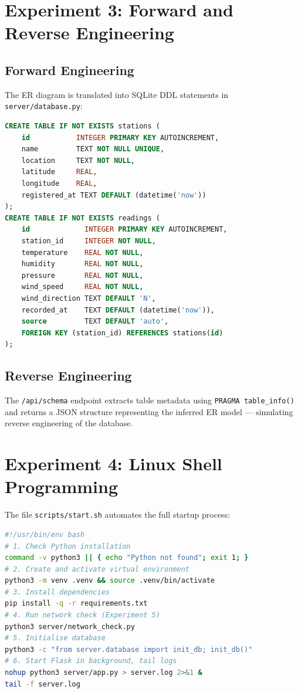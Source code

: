 \documentclass[12pt,a4paper]{article}
\begin{document}
\section{Experiment 3: Forward and Reverse Engineering}

\subsection{Forward Engineering}
The ER diagram is translated into SQLite DDL statements in \texttt{server/database.py}:

\begin{lstlisting}[language=SQL, caption=Forward Engineering — DDL from ER]
CREATE TABLE IF NOT EXISTS stations (
    id           INTEGER PRIMARY KEY AUTOINCREMENT,
    name         TEXT NOT NULL UNIQUE,
    location     TEXT NOT NULL,
    latitude     REAL,
    longitude    REAL,
    registered_at TEXT DEFAULT (datetime('now'))
);
CREATE TABLE IF NOT EXISTS readings (
    id             INTEGER PRIMARY KEY AUTOINCREMENT,
    station_id     INTEGER NOT NULL,
    temperature    REAL NOT NULL,
    humidity       REAL NOT NULL,
    pressure       REAL NOT NULL,
    wind_speed     REAL NOT NULL,
    wind_direction TEXT DEFAULT 'N',
    recorded_at    TEXT DEFAULT (datetime('now')),
    source         TEXT DEFAULT 'auto',
    FOREIGN KEY (station_id) REFERENCES stations(id)
);
\end{lstlisting}

\subsection{Reverse Engineering}
The \texttt{/api/schema} endpoint extracts table metadata using \texttt{PRAGMA table\_info()} and returns a JSON structure representing the inferred ER model — simulating reverse engineering of the database.

\section{Experiment 4: Linux Shell Programming}

The file \texttt{scripts/start.sh} automates the full startup process:

\begin{lstlisting}[language=bash, caption=Shell Script Highlights]
#!/usr/bin/env bash
# 1. Check Python installation
command -v python3 || { echo "Python not found"; exit 1; }
# 2. Create and activate virtual environment
python3 -m venv .venv && source .venv/bin/activate
# 3. Install dependencies
pip install -q -r requirements.txt
# 4. Run network check (Experiment 5)
python3 server/network_check.py
# 5. Initialise database
python3 -c "from server.database import init_db; init_db()"
# 6. Start Flask in background, tail logs
nohup python3 server/app.py > server.log 2>&1 &
tail -f server.log
\end{lstlisting}
\end{document}
